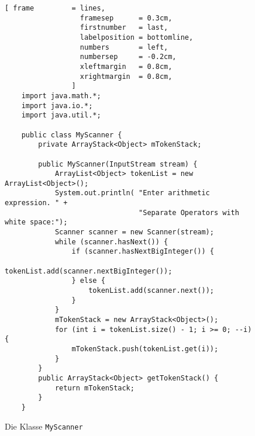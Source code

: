 \begin{figure}[!h]
  \centering
\begin{Verbatim}[ frame         = lines, 
                  framesep      = 0.3cm, 
                  firstnumber   = last,
                  labelposition = bottomline,
                  numbers       = left,
                  numbersep     = -0.2cm,
                  xleftmargin   = 0.8cm,
                  xrightmargin  = 0.8cm,
                ]
    import java.math.*;
    import java.io.*;
    import java.util.*;
    
    public class MyScanner {
        private ArrayStack<Object> mTokenStack;
    
        public MyScanner(InputStream stream) {
            ArrayList<Object> tokenList = new ArrayList<Object>();
            System.out.println( "Enter arithmetic expression. " + 
                                "Separate Operators with white space:");
            Scanner scanner = new Scanner(stream);
            while (scanner.hasNext()) {
                if (scanner.hasNextBigInteger()) {
                    tokenList.add(scanner.nextBigInteger());
                } else {
                    tokenList.add(scanner.next());
                }
            }
            mTokenStack = new ArrayStack<Object>();
            for (int i = tokenList.size() - 1; i >= 0; --i) {
                mTokenStack.push(tokenList.get(i));
            }
        }
        public ArrayStack<Object> getTokenStack() {
            return mTokenStack;
        }
    }               
\end{Verbatim}
\vspace*{-0.3cm}
  \caption{Die Klasse \texttt{MyScanner}}
  \label{fig:myscanner.java}
\end{figure}






